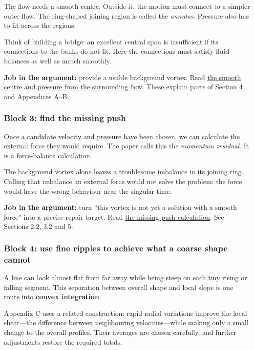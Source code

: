 \documentclass[
  english,
  11pt,
]{article}
\begin{document}
The flow needs a smooth centre. Outside it, the motion must connect to a
simpler outer flow. The ring-shaped joining region is called the
\emph{annulus}. Pressure also has to fit across the regions.

Think of building a bridge: an excellent central span is insufficient if
its connections to the banks do not fit. Here the connections must
satisfy fluid balances as well as match smoothly.

\textbf{Job in the argument:} provide a usable background vortex. Read
\href{../d6_inner_profile/article.html}{the smooth centre} and
\href{../d6_axis_pressure/article.html}{pressure from the surrounding
flow}. These explain parts of Section 4 and Appendices A--B.

\subsubsection{Block 3: find the missing
push}\label{block-3-find-the-missing-push}

Once a candidate velocity and pressure have been chosen, we can
calculate the external force they would require. The paper calls this
the \emph{momentum residual}. It is a force-balance calculation.

The background vortex alone leaves a troublesome imbalance in its
joining ring. Calling that imbalance an external force would not solve
the problem: the force would have the wrong behaviour near the singular
time.

\textbf{Job in the argument:} turn ``this vortex is not yet a solution
with a smooth force'' into a precise repair target. Read
\href{../d3_residual/article.html}{the missing-push calculation}. See
Sections 2.2, 3.2 and 5.

\subsubsection{Block 4: use fine ripples to achieve what a coarse shape
cannot}\label{block-4-use-fine-ripples-to-achieve-what-a-coarse-shape-cannot}

A line can look almost flat from far away while being steep on each tiny
rising or falling segment. This separation between overall shape and
local slope is one route into \textbf{convex integration}.

Appendix C uses a related construction: rapid radial variations improve
the local shear---the difference between neighbouring velocities---while
making only a small change to the overall profiles. Their averages are
chosen carefully, and further adjustments restore the required totals.
\end{document}
